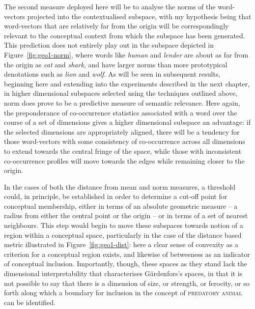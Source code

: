 The second measure deployed here will be to analyse the norms of the word-vectors projected into the contextualised subspace, with my hypothesis being that word-vectors that are relatively far from the origin will be correspondingly relevant to the conceptual context from which the subspace has been generated.  This prediction does not entirely play out in the subspace depicted in Figure~\ref{fig:geo1-norm}, where words like \emph{human} and \emph{lender} are about as far from the origin as \emph{cat} and \emph{shark}, and have larger norms than more prototypical denotations such as \emph{lion} and \emph{wolf}.  As will be seen in subsequent results, beginning here and extending into the experiments described in the next chapter, in higher dimensional subspaces selected using the techniques outlined above, norm does prove to be a predictive measure of semantic relevance.  Here again, the preponderance of co-occurrence statistics associated with a word over the course of a set of dimensions gives a higher dimensional subspace an advantage: if the selected dimensions are appropriately aligned, there will be a tendency for those word-vectors with some consistency of co-occurrence across all dimensions to extend towards the central fringe of the space, while those with inconsistent co-occurrence profiles will move towards the edges while remaining closer to the origin.

In the cases of both the distance from mean and norm measures, a threshold could, in principle, be established in order to determine a cut-off point for conceptual membership, either in terms of an absolute geometric measure -- a radius from either the central point or the origin -- or in terms of a set of nearest neighbours.  This step would begin to move these subspaces towards  notion of a region within a conceptual space, particularly in the case of the distance based metric illustrated in Figure~\ref{fig:geo1-dist}: here a clear sense of convexity as a criterion for a conceptual region exists, and likewise of betweeness as an indicator of conceptual inclusion.  Importantly, though, these spaces as they stand lack the dimensional interpretability that characterises G\"{a}rdenfors's spaces, in that it is not possible to say that there is a dimension of size, or strength, or ferocity, or so forth along which a boundary for inclusion in the concept of \textsc{predatory animal} can be identified.

